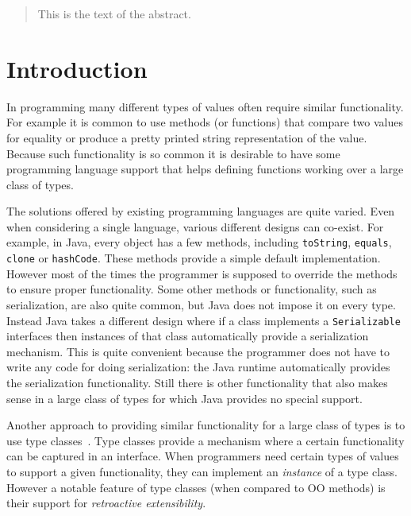 \documentclass[preprint]{sigplanconf}
\begin{document}
\maketitle

\begin{abstract}
This is the text of the abstract.
\end{abstract}




\section{Introduction}

In programming many different types of values often require similar
functionality. For example it is common to use methods (or
functions) that compare two values for equality or produce a pretty
printed string representation of the value. Because such functionality
is so common it is desirable to have some programming language support
that helps defining functions working over a large class of types.

The solutions offered by existing programming languages are quite
varied. Even when considering a single language, various different
designs can co-exist.  For example, in Java, every object has a few
methods, including \lstinline{toString}, \lstinline{equals},
\lstinline{clone} or \lstinline{hashCode}.  These methods provide a
simple default implementation. However most of the times the
programmer is supposed to override the methods to ensure proper
functionality. Some other methods or functionality, such as
serialization, are also quite common, but Java does not impose it on
every type. Instead Java takes a different design where if a class
implements a \lstinline{Serializable} interfaces then instances of
that class automatically provide a serialization mechanism. This is
quite convenient because the programmer does not have to write any
code for doing serialization: the Java runtime automatically provides
the serialization functionality. Still there is other functionality
that also makes sense in a large class of types for which Java
provides no special support.

Another approach to providing similar functionality for a large class
of types is to use type classes~\cite{}. Type classes provide a
mechanism where a certain functionality can be captured in an
interface. When programmers need certain types of values to support a
given functionality, they can implement an \emph{instance} of a type
class. However a notable feature of type classes (when compared
to OO methods) is their support for \emph{retroactive extensibility}.
\end{document}
